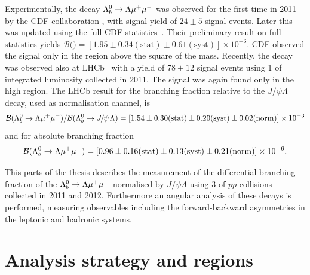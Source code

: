 Experimentally, the decay ${{\Lambda}^0_{b}}\rightarrow{\ensuremath{\Lambda}}{\ensuremath{\mu^+\mu^-}}$ was observed for the first time in 2011 by the CDF collaboration
\cite{Aaltonen:2011qs}, with signal yield of $24\pm5$ signal events. Later this was updated using the full
CDF statistics~\cite{CDF:10894}. Their preliminary result on full statistics yields
$\mathcal{B}($\Lb\to\Lz\mumu$) =[1.95\pm0.34(\mathrm{stat})\pm0.61(\mathrm{syst})]\times 10^{-6}$. CDF observed the signal
only in the \qsq region above the square of the \psitwos mass.
Recently, the decay was observed also at LHCb~\cite{LHCb-PAPER-2013-025} with a yield of $78\pm12$ signal events
using 1 \invfb of integrated luminosity collected in 2011. The signal was again found only in the high \qsq region.
The LHCb result for the branching fraction relative to the $J/\psi\Lambda$ decay, used as normalisation channel, is 
%
\begin{equation*}
\mathcal{B}(\Lb\to\Lz\mumu)/\mathcal{B}(\Lb\to\jpsi\Lz)=[1.54\pm0.30(\mathrm{stat})\pm0.20(\mathrm{syst})\pm0.02(\mathrm{norm})]\times 10^{-3} 
\end{equation*}
and for absolute branching fraction
\begin{equation*}
\mathcal{B}({{\Lambda}^0_{b}}\rightarrow{\ensuremath{\Lambda}}{\ensuremath{\mu^+\mu^-}}) =[0.96\pm0.16(\mathrm{stat})\pm0.13(\mathrm{syst})\pm0.21(\mathrm{norm})]\times 10^{-6}.
\end{equation*}

This parts of the thesis describes the measurement of the differential branching fraction
of the ${{\Lambda}^0_{b}}\rightarrow{\ensuremath{\Lambda}}{\ensuremath{\mu^+\mu^-}}$ normalised by $J/\psi\Lambda$ using 3 \invfb of $pp$ collisions collected in 2011 and 2012.
Furthermore an angular analysis of these decays is performed, measuring observables including
the forward-backward asymmetries in the leptonic and hadronic systems.

\section{Analysis strategy and \qsq regions}
\label{sec:Lb_q2choice}

